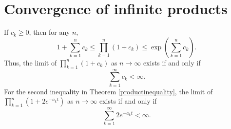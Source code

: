 \documentclass{article}
\begin{document}
\section{Convergence of infinite products}
If $c_k \geq 0$, then for any $n$,
\[
1+\sum_{k=1}^n c_k \leq \prod_{k=1}^n (1+c_k) \leq \exp\left(\sum_{k=1}^n c_k \right).
\]
Thus, the limit of $\prod_{k=1}^n (1+c_k)$ as $n \to \infty$ exists if and only if
\[
\sum_{k=1}^\infty c_k<\infty.
\]
 For the second inequality in Theorem \ref{productinequality}, 
the limit of $\prod_{k=1}^n \left(1+2e^{-a_kt}\right)$ as $n \to \infty$ exists if and only if
\[
\sum_{k=1}^\infty 2e^{-a_kt}<\infty.
\]
\end{document}
